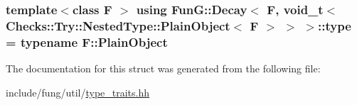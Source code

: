 \subsubsection[{\texorpdfstring{type}{type}}]{\setlength{\rightskip}{0pt plus 5cm}template$<$class F $>$ using {\bf Fun\+G\+::\+Decay}$<$ F, {\bf void\+\_\+t}$<$ Checks\+::\+Try\+::\+Nested\+Type\+::\+Plain\+Object$<$ F $>$ $>$ $>$\+::{\bf type} =  typename F\+::\+Plain\+Object}\hypertarget{structFunG_1_1Decay_3_01F_00_01void__t_3_01Checks_1_1Try_1_1NestedType_1_1PlainObject_3_01F_01_4_01_4_01_4_a27b32af38cd1fb109944b71825771648}{}\label{structFunG_1_1Decay_3_01F_00_01void__t_3_01Checks_1_1Try_1_1NestedType_1_1PlainObject_3_01F_01_4_01_4_01_4_a27b32af38cd1fb109944b71825771648}


The documentation for this struct was generated from the following file\+:\begin{DoxyCompactItemize}
\item 
include/fung/util/\hyperlink{type__traits_8hh}{type\+\_\+traits.\+hh}\end{DoxyCompactItemize}
